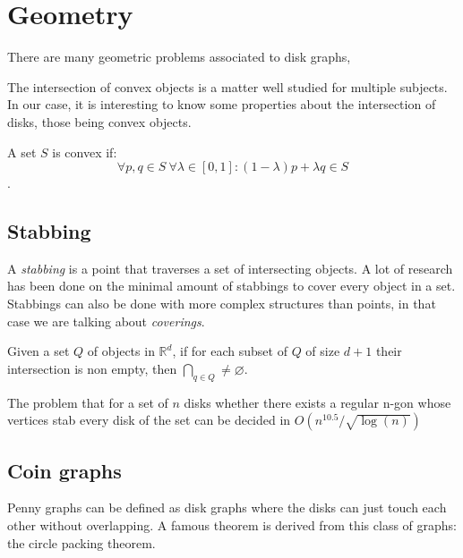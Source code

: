 \section{Geometry}
\label{sec:geom}

There are many geometric problems associated to disk graphs,

The intersection of convex objects is a matter well studied for multiple
subjects. In our case, it is interesting to know some properties about
the intersection of disks, those being convex objects.

A set $S$ is convex if:
$$\forall p,q \in S\  \forall \lambda \in [0,1]: (1-\lambda)p + \lambda q \in S$$.

\subsection{Stabbing}
A \textit{stabbing} is a point that traverses a set of intersecting objects. A lot of
research has been done \cite{schlipf2013stabbing} on the minimal amount of stabbings to
cover every object in a set. Stabbings can also be done with more complex structures
than points, in that case we are talking about \textit{coverings}.

\begin{theorem}[Helly]
  Given a set $Q$ of objects in $\mathbb{R}^d$, if for each subset of $Q$ of
  size $d+1$ their intersection is non empty, then $\bigcap_{q \in Q} \neq
  \varnothing$. \cite{Helly1923175}
\end{theorem}

\begin{theorem}
  The problem that for a set of $n$ disks whether there exists a regular n-gon
  whose vertices stab every disk of the set can be decided in $O(n^{10.5} / \sqrt{\log(n)})$ \cite{schlipf2013stabbing}
\end{theorem}

\subsection{Coin graphs}

Penny graphs can be defined as disk graphs where the disks can just touch each
other without overlapping. A famous theorem is derived from this class of graphs:
the circle packing theorem.

